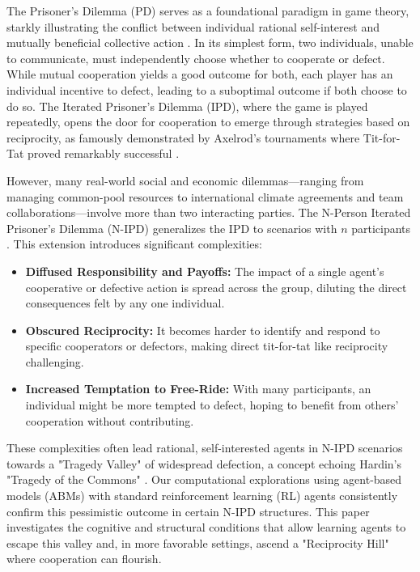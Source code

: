 \documentclass[]{llncs} %
\begin{document}
The Prisoner's Dilemma (PD) serves as a foundational paradigm in game theory, starkly illustrating the conflict between individual rational self-interest and mutually beneficial collective action \cite{Axelrod}. %
In its simplest form, two individuals, unable to communicate, must independently choose whether to cooperate or defect. While mutual cooperation yields a good outcome for both, each player has an individual incentive to defect, leading to a suboptimal outcome if both choose to do so. The Iterated Prisoner's Dilemma (IPD), where the game is played repeatedly, opens the door for cooperation to emerge through strategies based on reciprocity, as famously demonstrated by Axelrod's tournaments where Tit-for-Tat proved remarkably successful \cite{Axelrod}. %

However, many real-world social and economic dilemmas—ranging from managing common-pool resources to international climate agreements and team collaborations—involve more than two interacting parties. The N-Person Iterated Prisoner's Dilemma (N-IPD) generalizes the IPD to scenarios with $n$ participants \cite{Hamburger1973, Hardin1971}. %
This extension introduces significant complexities:
\begin{itemize}
    \item \textbf{Diffused Responsibility and Payoffs:} The impact of a single agent's cooperative or defective action is spread across the group, diluting the direct consequences felt by any one individual.
    \item \textbf{Obscured Reciprocity:} It becomes harder to identify and respond to specific cooperators or defectors, making direct tit-for-tat like reciprocity challenging.
    \item \textbf{Increased Temptation to Free-Ride:} With many participants, an individual might be more tempted to defect, hoping to benefit from others' cooperation without contributing.
\end{itemize}

These complexities often lead rational, self-interested agents in N-IPD scenarios towards a "Tragedy Valley" of widespread defection, a concept echoing Hardin's "Tragedy of the Commons" \cite{Hardin1968}. %
Our computational explorations using agent-based models (ABMs) with standard reinforcement learning (RL) agents consistently confirm this pessimistic outcome in certain N-IPD structures. This paper investigates the cognitive and structural conditions that allow learning agents to escape this valley and, in more favorable settings, ascend a "Reciprocity Hill" where cooperation can flourish.
\end{document}
